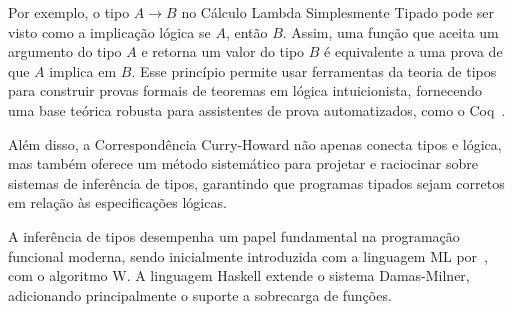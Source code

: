Por exemplo, o tipo $A \to B$ no Cálculo Lambda Simplesmente Tipado pode ser visto como a implicação lógica se $A$, então $B$.
Assim, uma função que aceita um argumento do tipo $A$ e retorna um valor do tipo $B$ é equivalente a uma prova de que $A$ implica em $B$.
Esse princípio permite usar ferramentas da teoria de tipos para construir provas formais de teoremas em lógica intuicionista, fornecendo uma base teórica robusta para assistentes de prova automatizados, como o Coq~\cite{coquand1988calculus}.

Além disso, a Correspondência Curry-Howard não apenas conecta tipos e lógica, mas também oferece um método sistemático para projetar e raciocinar sobre sistemas de inferência de tipos, garantindo que programas tipados sejam corretos em relação às especificações lógicas.

A inferência de tipos desempenha um papel fundamental na programação funcional moderna, sendo inicialmente introduzida com a linguagem ML por~, com o algoritmo W.
A linguagem Haskell extende o sistema Damas-Milner, adicionando principalmente o suporte a sobrecarga de funções.

